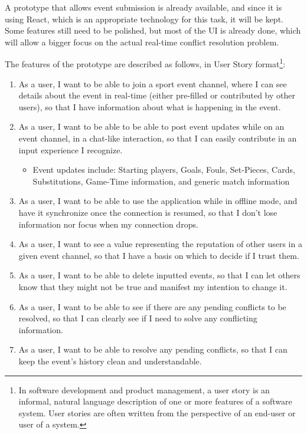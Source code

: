 A prototype that allows event submission is already available, and since it is using React, which is an appropriate technology for this task, it will be kept. Some features still need to be polished, but most of the UI is already done, which will allow a bigger focus on the actual real-time conflict resolution problem.

The features of the prototype are described as follows, in User Story format\footnote{In software development and product management, a user story is an informal, natural language description of one or more features of a software system. User stories are often written from the perspective of an end-user or user of a system.}:

\begin{enumerate}[leftmargin  = 3.25\parindent, align=left, label=US\arabic*, start=1]
    \item As a user, I want to be able to join a sport event channel, where I can see details about the event in real-time (either pre-filled or contributed by other users), so that I have information about what is happening in the event.
    \item As a user, I want to be able to be able to post event updates while on an event channel, in a chat-like interaction, so that I can easily contribute in an input experience I recognize.
    \begin{itemize}
        \item Event updates include: Starting players, Goals, Fouls, Set-Pieces, Cards, Substitutions, Game-Time information, and generic match information
    \end{itemize} 
    \item As a user, I want to be able to use the application while in offline mode, and have it synchronize once the connection is resumed, so that I don't lose information nor focus when my connection drops.
    \item As a user, I want to see a value representing the reputation of other users in a given event channel, so that I have a basis on which to decide if I trust them. 
    \item As a user, I want to be able to delete inputted events, so that I can let others know that they might not be true and manifest my intention to change it.
    \item As a user, I want to be able to see if there are any pending conflicts to be resolved, so that I can clearly see if I need to solve any conflicting information.
    \item As a user, I want to be able to resolve any pending conflicts, so that I can keep the event's history clean and understandable.

\end{enumerate}
